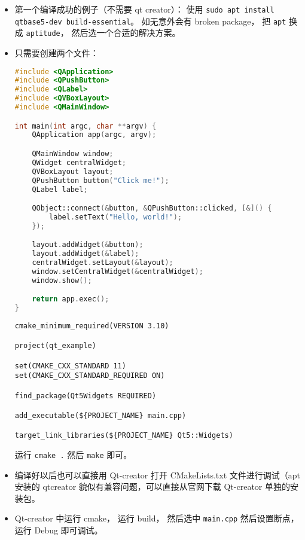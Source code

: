 \begin{itemize}
\item 第一个编译成功的例子（不需要 qt creator）： 使用 \verb|sudo apt install qtbase5-dev build-essential|。 如无意外会有 broken package， 把 \verb|apt| 换成 \verb|aptitude|， 然后选一个合适的解决方案。
\item 只需要创建两个文件：
\begin{lstlisting}[language=cpp,caption=main.cpp]
#include <QApplication>
#include <QPushButton>
#include <QLabel>
#include <QVBoxLayout>
#include <QMainWindow>

int main(int argc, char **argv) {
    QApplication app(argc, argv);

    QMainWindow window;
    QWidget centralWidget;
    QVBoxLayout layout;
    QPushButton button("Click me!");
    QLabel label;

    QObject::connect(&button, &QPushButton::clicked, [&]() {
        label.setText("Hello, world!");
    });

    layout.addWidget(&button);
    layout.addWidget(&label);
    centralWidget.setLayout(&layout);
    window.setCentralWidget(&centralWidget);
    window.show();

    return app.exec();
}
\end{lstlisting}
\begin{lstlisting}[language=none,caption=CMakeLists.txt]
cmake_minimum_required(VERSION 3.10)

project(qt_example)

set(CMAKE_CXX_STANDARD 11)
set(CMAKE_CXX_STANDARD_REQUIRED ON)

find_package(Qt5Widgets REQUIRED)

add_executable(${PROJECT_NAME} main.cpp)

target_link_libraries(${PROJECT_NAME} Qt5::Widgets)
\end{lstlisting}
运行 \verb|cmake .| 然后 \verb|make| 即可。
\item 编译好以后也可以直接用 Qt-creator 打开 CMakeLists.txt 文件进行调试（apt 安装的 qtcreator 貌似有兼容问题，可以直接从官网下载 Qt-creator 单独的安装包。
\item Qt-creator 中运行 cmake， 运行 build， 然后选中 \verb|main.cpp| 然后设置断点， 运行 Debug 即可调试。
\end{itemize}
